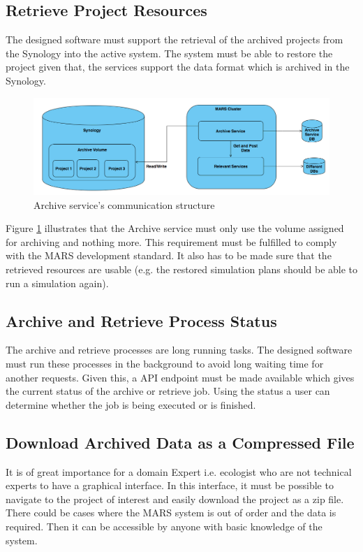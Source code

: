         \subsection{Retrieve Project Resources}    
            \label{ssec:retrieveAnalysis}
            The designed software must support the retrieval of the archived projects from the Synology into the active system. The
            system must be able to restore the project given that, the services support the data format which is archived in the Synology.
           
            \begin{figure}[H]
                \centering \includegraphics[scale=0.4]{grafiken/synology.png}
                \caption{Archive service's communication structure}
                \label{fig:synology}
            \end{figure}

            Figure \ref{fig:synology} illustrates that the Archive service must only use the volume assigned for archiving and nothing more. 
            This requirement must be fulfilled to comply with the MARS development standard. It also has to be made sure that the retrieved
            resources are usable (e.g. the restored simulation plans should be able to run a simulation again). 

        \subsection{Archive and Retrieve Process Status}  
            The archive and retrieve processes are long running tasks. The designed software must run these processes in the background to avoid 
            long waiting time for another requests. Given this, a API endpoint must be made available which gives the current status of the archive 
            or retrieve job. Using the status a user can determine whether the job is being executed or is finished.


        \subsection{Download Archived Data as a Compressed File}
        \label{sec:anaCompress}
            It is of great importance for a domain Expert i.e. ecologist who are not technical experts to have a graphical interface. In this interface,
            it must be possible to navigate to the project of interest and easily download the project as a zip file. There could be cases where the
            MARS system is out of order and the data is required. Then it can be accessible by anyone with basic knowledge of the system.
        
